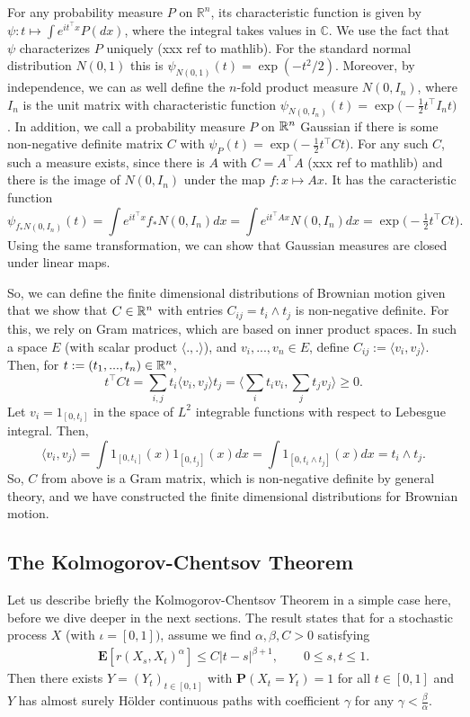 \documentclass[lean]{DraftAFM}
\begin{document}
For any probability measure $P$ on $\mathbb R^n$, its characteristic function is given by $\psi: t \mapsto \int e^{it^\top x} P(dx)$, where the integral takes values in $\mathbb C$. We use the fact that $\psi$ characterizes $P$ uniquely (xxx ref to mathlib). For the standard normal distribution $N(0,1)$ this is $\psi_{N(0,1)}(t) = \exp(-t^2/2)$. Moreover, by independence, we can as well define the $n$-fold product measure $N(0, I_n)$, where $I_n$ is the unit matrix with characteristic function $\psi_{N(0,I_n)}(t) = \exp\big(-\tfrac 12 t^\top I_n t\big)$. In addition, we call a probability measure $P$ on $\mathbb{R}^n$ Gaussian if there is some non-negative definite matrix $C$ with $\psi_P(t) = \exp\big( - \tfrac 12 t^\top C t\big)$. For any such $C$, such a measure exists, since there is $A$ with $C = A^\top A$ (xxx ref to mathlib) and there is the image of $N(0,I_n)$ under the map $f : x\mapsto Ax$. It has the caracteristic function $$\psi_{f_\ast N(0,I_n)}(t) = \int e^{it^\top x} f_\ast N(0,I_n) dx = \int e^{it^\top A x} N(0,I_n) dx = \exp\big( - \tfrac 12 t^\top C t\big).$$ Using the same transformation, we can show that Gaussian measures are closed under linear maps.

So, we can define the finite dimensional distributions of Brownian motion given that we show that $C \in \mathbb{R}^n$ with entries $C_{ij} = t_i \wedge t_j$ is non-negative definite. For this, we rely on Gram matrices, which are based on inner product spaces. In such a space $E$ (with scalar product $\langle .,. \rangle$), and $v_i,...,v_n \in E$, define $C_{ij} := \langle v_i, v_j\rangle$. Then, for $t :=(t_1,...,t_n) \in \mathbb{R}^n$,
$$ t^\top C t = \sum_{i,j} t_i \langle v_i, v_j\rangle t_j = \Big\langle \sum_i t_i v_i, \sum_j t_j v_j\Big\rangle \geq 0.$$
Let $v_i = 1_{[0,t_i]}$ in the space of $L^2$ integrable functions with respect to Lebesgue integral. Then,
$$ \langle v_i, v_j \rangle = \int 1_{[0,t_i]}(x) 1_{[0,t_j]}(x) dx = \int 1_{[0,t_i \wedge t_j]}(x) dx = t_i \wedge t_j.$$
So, $C$ from above is a Gram matrix, which is non-negative definite by general theory, and we have constructed the finite dimensional distributions for Brownian motion.

\cite{hairer2009introduction}

\subsection{The Kolmogorov-Chentsov Theorem}
Let us describe briefly the Kolmogorov-Chentsov Theorem in a simple case here, before we dive deeper in the next sections. The result states that for a stochastic process $X$ (with $\iota = [0,1])$, assume we find $\alpha, \beta, C > 0$ satisfying
\begin{align}
\label{eq:cs}
  \mathbf E[r(X_s, X_t)^\alpha] \leq C|t-s|^{\beta + 1}, \qquad 0\leq s,t\leq 1.
\end{align}
Then there exists $Y = (Y_t)_{t\in [0,1]}$ with $\mathbf P(X_t = Y_t) = 1$ for all $t\in [0,1]$ and $Y$ has almost surely Hölder continuous paths with coefficient $\gamma$ for any $\gamma < \tfrac \beta \alpha$.
\end{document}
